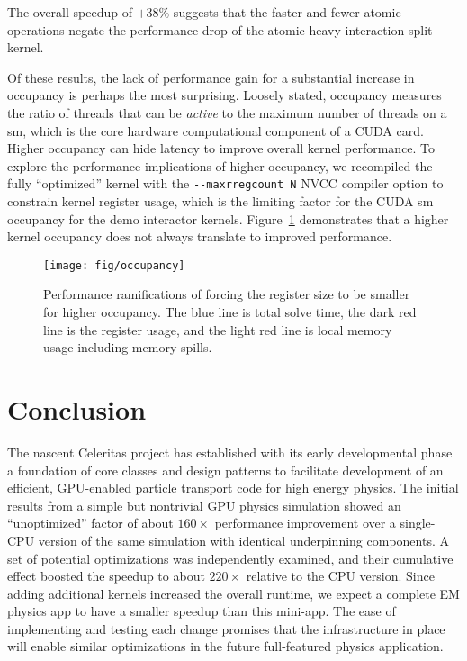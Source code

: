 \documentclass{webofc}
\begin{document}
%
The overall speedup of $+38\%$ suggests that the faster and fewer atomic
operations negate the performance drop of the atomic-heavy interaction split
kernel.

Of these results, the lack of performance gain for a substantial increase in
occupancy is perhaps the most surprising.
Loosely stated, occupancy measures the ratio of threads that can be
\emph{active} to the maximum number of threads on a \ac{sm},
which is the core hardware computational component of a CUDA card. Higher
occupancy can hide latency to improve overall kernel performance.
To explore the performance implications of higher occupancy, we recompiled the
fully ``optimized'' kernel with the \verb|--maxrregcount N| NVCC
compiler option to constrain kernel register usage,
which is the limiting factor for the CUDA \ac{sm} occupancy for the demo
interactor kernels. Figure~\ref{fig:occupancy} demonstrates that a higher
kernel occupancy does not always translate to improved performance.
%
\begin{figure}[htb]
  \centering%
  \texttt{[image: fig/occupancy]}%
  \caption{Performance ramifications of forcing the register size to be smaller
  for higher occupancy. The blue line is total solve time, the dark red line is
the register usage, and the light red line is local memory usage including
memory spills.}%
  \label{fig:occupancy}
\end{figure}

\section{Conclusion}

The nascent Celeritas project has established with its
early developmental phase a foundation of core classes and
design patterns to facilitate development of an efficient, GPU-enabled particle
transport code for high energy physics. The initial results from a simple but
nontrivial GPU physics simulation showed an ``unoptimized'' factor of about
$160\times$ performance improvement over a single-CPU version of the same
simulation with identical underpinning components. A set of potential
optimizations was independently examined, and their cumulative effect boosted
the speedup to about $220\times$ relative to the CPU version. Since adding
additional kernels increased the overall runtime, we expect a complete EM
physics app to have a smaller speedup than this mini-app.  The ease of
implementing and testing each change promises that the infrastructure in place
will enable similar optimizations in the future full-featured physics
application.
\end{document}
